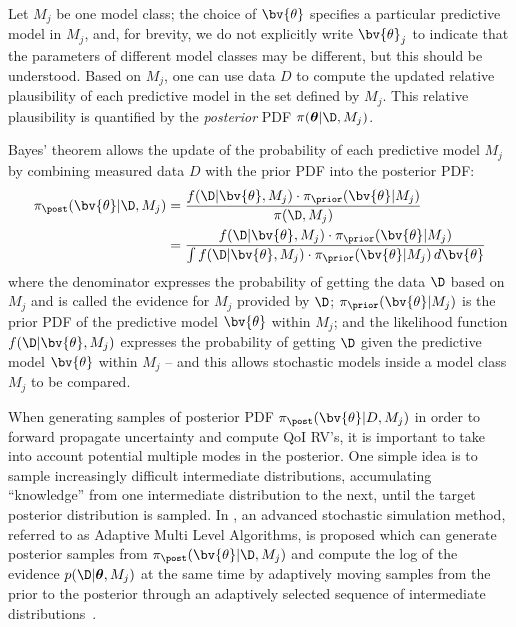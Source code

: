 Let $M_j$ be one model class; the choice of $\bv{\theta} $ specifies a particular predictive model in $M_j$, and, for brevity, we do not explicitly write $\bv{\theta}_j $ to indicate that the parameters of different model classes may be different, but this should be understood.  Based on $M_j$, one can use data $D$ to compute
the updated relative plausibility of each predictive model in the set
defined by $M_j$.  This relative plausibility is quantified by the
\textit{posterior} PDF $\pi(\boldsymbol{\theta}|\D,M_j)$.


Bayes’ theorem allows the update of the probability of each predictive model $M_j$ by combining measured data $D$ with the prior PDF into the posterior PDF:
\begin{equation}
\begin{split}
\pi_\post (\bv{\theta}|\D, M_j) &= \dfrac{f(\D|\bv{\theta}, M_j) \cdot \pi_\prior (\bv{\theta} | M_j)}{\pi(\D, M_j)} 
\\
&= \dfrac{f(\D|\bv{\theta}, M_j) \cdot \pi_\prior (\bv{\theta} | M_j)}{\int f(\D|\bv{\theta}, M_j) \cdot \pi_\prior (\bv{\theta} | M_j)\, d\bv{\theta}} 
\end{split}
\end{equation}
where the denominator expresses the probability of getting the data $\D$ based on $M_j$ and is called the evidence for
$M_j$ provided by $\D$; $\pi_\prior (\bv{\theta} | M_j)$ is the prior PDF of the predictive model $\bv{\theta}$ within $M_j$; and the likelihood function $f(\D|\bv{\theta}, M_j)$ expresses the probability of getting $\D$ given the predictive model $\bv{\theta}$ within $M_j$ -- and this allows stochastic models inside a model class $M_j$ to be compared. 







When generating samples of posterior PDF $\pi_\post(\bv{\theta}|D,M_j) $ in order to forward propagate uncertainty and compute QoI RV's, it is important to take into account potential multiple modes in the posterior. One simple idea is to sample increasingly difficult intermediate distributions, accumulating ``knowledge'' from one intermediate distribution to the next, until the target posterior distribution is sampled.  In
\cite{CheungPrudencio2012}, an advanced stochastic simulation
method, referred to as Adaptive Multi Level Algorithms, is proposed
which can generate posterior samples from $\pi_\post (\bv{\theta}|\D, M_j)$
and compute the log of the evidence
$p(\D | \boldsymbol{\theta},M_j)$ at the same time by adaptively moving
samples from the prior to the posterior through an adaptively selected
sequence of intermediate distributions~\cite{ChOlPr10}.  

